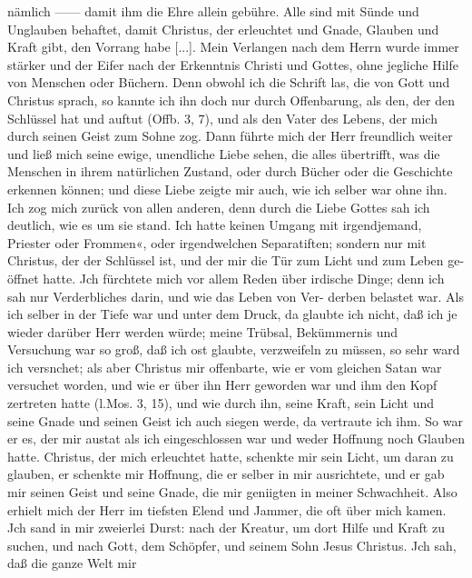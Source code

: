 
nämlich —— damit ihm die Ehre allein gebühre. Alle sind mit
Sünde und Unglauben behaftet, damit Christus, der erleuchtet
und Gnade, Glauben und Kraft gibt, den Vorrang habe [...].
Mein Verlangen nach dem Herrn wurde immer stärker und der
Eifer nach der Erkenntnis Christi und Gottes, ohne jegliche Hilfe
von Menschen oder Büchern. Denn obwohl ich die Schrift las,
die von Gott und Christus sprach, so kannte ich ihn doch nur
durch Offenbarung, als den, der den Schlüssel hat und auftut
(Offb. 3, 7), und als den Vater des Lebens, der mich durch seinen
Geist zum Sohne zog. Dann führte mich der Herr freundlich
weiter und ließ mich seine ewige, unendliche Liebe sehen, die
alles übertrifft, was die Menschen in ihrem natürlichen Zustand,
oder durch Bücher oder die Geschichte erkennen können;
und diese Liebe zeigte mir auch, wie ich selber war ohne ihn.
Ich zog mich zurück von allen anderen, denn durch die Liebe
Gottes sah ich deutlich, wie es um sie stand. Ich hatte keinen
Umgang mit irgendjemand, Priester oder Frommen«, oder
irgendwelchen Separatiften; sondern nur mit Christus, der der
Schlüssel ist, und der mir die Tür zum Licht und zum Leben ge-
öffnet hatte. Jch fürchtete mich vor allem Reden über irdische Dinge;
denn ich sah nur Verderbliches darin, und wie das Leben von Ver-
derben belastet war. Als ich selber in der Tiefe war und unter dem
Druck, da glaubte ich nicht, daß ich je wieder darüber Herr werden
würde; meine Trübsal, Bekümmernis und Versuchung war so
groß, daß ich ost glaubte, verzweifeln zu müssen, so sehr ward
ich versnchet; als aber Christus mir offenbarte, wie er vom gleichen
Satan war versuchet worden, und wie er über ihn Herr geworden
war und ihm den Kopf zertreten hatte (l.Mos. 3, 15), und wie durch
ihn, seine Kraft, sein Licht und seine Gnade und seinen Geist ich
auch siegen werde, da vertraute ich ihm. So war er es, der mir
austat als ich eingeschlossen war und weder Hoffnung noch Glauben
hatte. Christus, der mich erleuchtet hatte, schenkte mir sein Licht,
um daran zu glauben, er schenkte mir Hoffnung, die er selber in
mir ausrichtete, und er gab mir seinen Geist und seine Gnade,
die mir geniigten in meiner Schwachheit. Also erhielt mich der
Herr im tiefsten Elend und Jammer, die oft über mich kamen.
Jch sand in mir zweierlei Durst: nach der Kreatur, um dort
Hilfe und Kraft zu suchen, und nach Gott, dem Schöpfer, und
seinem Sohn Jesus Christus. Jch sah, daß die ganze Welt mir




